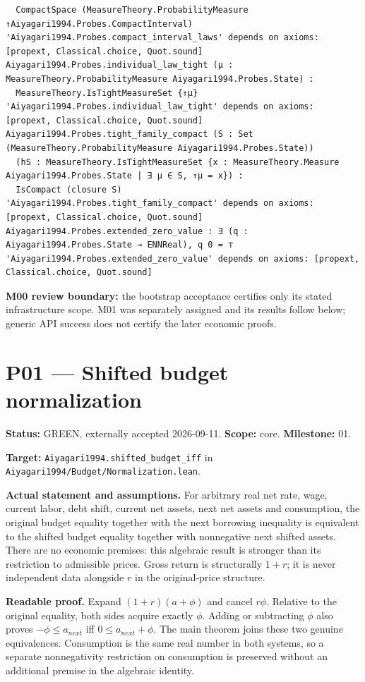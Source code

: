 \documentclass[
  11pt,
]{article}
\let\LedgerOriginalTexttt\texttt
\renewcommand{\texttt}[1]{{\small\LedgerOriginalTexttt{#1}}}
\begin{document}
\begin{verbatim}
  CompactSpace (MeasureTheory.ProbabilityMeasure ↑Aiyagari1994.Probes.CompactInterval)
'Aiyagari1994.Probes.compact_interval_laws' depends on axioms: [propext, Classical.choice, Quot.sound]
Aiyagari1994.Probes.individual_law_tight (μ : MeasureTheory.ProbabilityMeasure Aiyagari1994.Probes.State) :
  MeasureTheory.IsTightMeasureSet {↑μ}
'Aiyagari1994.Probes.individual_law_tight' depends on axioms: [propext, Classical.choice, Quot.sound]
Aiyagari1994.Probes.tight_family_compact (S : Set (MeasureTheory.ProbabilityMeasure Aiyagari1994.Probes.State))
  (hS : MeasureTheory.IsTightMeasureSet {x : MeasureTheory.Measure Aiyagari1994.Probes.State | ∃ μ ∈ S, ↑μ = x}) :
  IsCompact (closure S)
'Aiyagari1994.Probes.tight_family_compact' depends on axioms: [propext, Classical.choice, Quot.sound]
Aiyagari1994.Probes.extended_zero_value : ∃ (q : Aiyagari1994.Probes.State → ENNReal), q 0 = ⊤
'Aiyagari1994.Probes.extended_zero_value' depends on axioms: [propext, Classical.choice, Quot.sound]
\end{verbatim}

\textbf{M00 review boundary:} the bootstrap acceptance certifies only
its stated infrastructure scope. M01 was separately assigned and its
results follow below; generic API success does not certify the later
economic proofs.

\section{P01 --- Shifted budget
normalization}\label{p01-shifted-budget-normalization}

\textbf{Status:} GREEN, externally accepted 2026-09-11. \textbf{Scope:}
core. \textbf{Milestone:} 01.

\textbf{Target:} \texttt{Aiyagari1994.shifted\_budget\_iff} in
\texttt{Aiyagari1994/Budget/Normalization.lean}.

\textbf{Actual statement and assumptions.} For arbitrary real net rate,
wage, current labor, debt shift, current net assets, next net assets and
consumption, the original budget equality together with the next
borrowing inequality is equivalent to the shifted budget equality
together with nonnegative next shifted assets. There are no economic
premises: this algebraic result is stronger than its restriction to
admissible prices. Gross return is structurally \(1+r\); it is never
independent data alongside \(r\) in the original-price structure.

\textbf{Readable proof.} Expand \((1+r)(a+\phi)\) and cancel \(r\phi\).
Relative to the original equality, both sides acquire exactly \(\phi\).
Adding or subtracting \(\phi\) also proves \(-\phi\leq a_{next}\) iff
\(0\leq a_{next}+\phi\). The main theorem joins these two genuine
equivalences. Consumption is the same real number in both systems, so a
separate nonnegativity restriction on consumption is preserved without
an additional premise in the algebraic identity.
\end{document}
